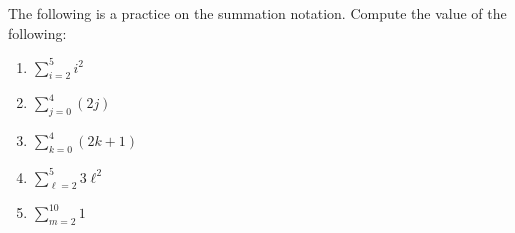 The following is a practice on the summation notation.
Compute the value of the following:
\begin{enumerate}[itemsep=4pt, label=(\alph*)]

\item $\sum_{i = 2}^5 i^2$

\item $\sum_{j = 0}^4 (2j)$

\item $\sum_{k = 0}^4 (2k + 1)$

\item $\sum_{\ell = 2}^5 3\ell^2$

\item $\sum_{m = 2}^{10} 1$

\end{enumerate}
